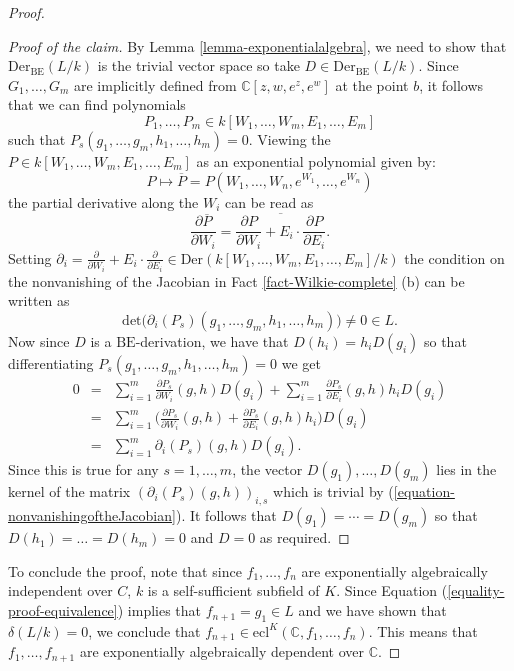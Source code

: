 \documentclass[10pt,a4paper]{amsart}
\newcommand{\BE}{\mathrm{BE}}
\newcommand{\C}{\mathbb{C}}
\begin{document}
\begin{proof}
\begin{proof}[Proof of the claim]
By Lemma \ref{lemma-exponentialalgebra}, we need to show that $\mathrm{Der}_{\BE}(L/k)$ is the trivial vector space so take $D \in \mathrm{Der}_{\BE}(L/k)$.  Since $G_1,\ldots,G_m$ are implicitly defined from $\mathbb{C}[z,w,e^z,e^w]$ at the point $b$, it follows that we can find polynomials $$P_1,\ldots,P_m \in k[W_1,\ldots,W_m, E_1,\ldots,E_m]$$ such that $P_s(g_1,\ldots,g_m,h_1,\ldots,h_m) = 0$. Viewing the $P \in k[W_1,\ldots, W_m, E_1,\ldots, E_m]$ as an exponential polynomial given by:
$$ P \mapsto \overline{P} =  P(W_1,\ldots,W_n,e^{W_1},\ldots, e^{W_n})  $$
the partial derivative along the $W_i$ can be read as 
$$ \frac{\partial \overline{P}}{\partial W_i} = \overline{\frac{\partial P} {\partial W_i} + E_i \cdot \frac {\partial P} {\partial E_i}}.$$ 
Setting $\partial_i = \frac{\partial} {\partial W_i} + E_i \cdot \frac {\partial} {\partial E_i} \in \mathrm{Der}(k[W_1,\ldots,W_m,E_1,\ldots,E_m]/k)$ the condition on the nonvanishing of the Jacobian in Fact  \ref{fact-Wilkie-complete} (b) can be written as
\begin{equation}\label{equation-nonvanishingoftheJacobian}
 \mathrm{det}\Big( \partial_i(P_s) (g_1,\ldots,g_m,h_1,\ldots,h_m) \Big) \neq 0 \in L.
 \end{equation}
Now since $D$ is a $\BE$-derivation, we have that $D(h_i) = h_i D(g_i)$ so that differentiating $P_s(g_1,\ldots,g_m,h_1,\ldots,h_m) = 0$ we get 
\begin{eqnarray*}
0  & = &  \sum_{i = 1}^m \frac{\partial P_s}{\partial W_i}(g,h) D(g_i) + \sum_{i = 1}^m \frac{\partial P_s}{\partial E_i}(g,h) h_i D(g_i) \\
& = & \sum_{i = 1}^m \Big( \frac{\partial P_s}{\partial W_i}(g,h) + \frac{\partial P_s}{\partial E_i}(g,h) h_i \Big) D(g_i) \\
& = &  \sum_{i = 1}^m \partial_i(P_s)(g,h) D(g_i).
\end{eqnarray*}
Since this is true for any $s = 1,\ldots, m$, the vector $D(g_1),\ldots, D(g_m)$ lies in the kernel of the matrix $(\partial_i(P_s)(g,h))_{i,s}$ which is trivial by (\ref{equation-nonvanishingoftheJacobian}). It follows that $D(g_1) = \cdots = D(g_m) $ so that $D(h_1) = \ldots = D(h_m) = 0$ and $D = 0$ as required.
\end{proof}
To conclude the proof, note that since $f_1,\ldots,f_n$ are exponentially algebraically independent over $C$, $k$ is a self-sufficient subfield of $K$. Since Equation (\ref{equality-proof-equivalence}) implies that $f_{n+1} = g_1 \in L$ and we have shown that $\delta(L/k) = 0$, we conclude that $f_{n+1} \in \mathrm{ecl}^{K}(\C, f_1,\ldots,f_n)$. This means that $f_1,\ldots, f_{n+1}$ are exponentially algebraically dependent over $\mathbb{C}$.
\end{proof} 
\end{document}
